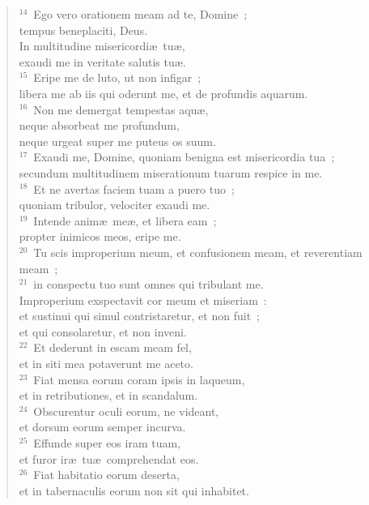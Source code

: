 \begin{flushleft}
\begin{verse}
${}^{14}$~Ego vero orationem meam ad te, Domine~;\\ tempus beneplaciti, Deus.\\ In multitudine misericordi\ae\ tu\ae ,\\ exaudi me in veritate salutis tu\ae .\\
${}^{15}$~Eripe me de luto, ut non infigar~;\\ libera me ab iis qui oderunt me, et de profundis aquarum.\\
${}^{16}$~Non me demergat tempestas aqu\ae ,\\ neque absorbeat me profundum,\\ neque urgeat super me puteus os suum.\\
${}^{17}$~Exaudi me, Domine, quoniam benigna est misericordia tua~;\\ secundum multitudinem miserationum tuarum respice in me.\\
${}^{18}$~Et ne avertas faciem tuam a puero tuo~;\\ quoniam tribulor, velociter exaudi me.\\
${}^{19}$~Intende anim\ae\ me\ae , et libera eam~;\\ propter inimicos meos, eripe me.\\
${}^{20}$~Tu scis improperium meum, et confusionem meam, et reverentiam meam~;\\
${}^{21}$~in conspectu tuo sunt omnes qui tribulant me.\\ Improperium exspectavit cor meum et miseriam~:\\ et sustinui qui simul contristaretur, et non fuit~;\\ et qui consolaretur, et non inveni.\\
${}^{22}$~Et dederunt in escam meam fel,\\ et in siti mea potaverunt me aceto.\\
${}^{23}$~Fiat mensa eorum coram ipsis in laqueum,\\ et in retributiones, et in scandalum.\\
${}^{24}$~Obscurentur oculi eorum, ne videant,\\ et dorsum eorum semper incurva.\\
${}^{25}$~Effunde super eos iram tuam,\\ et furor ir\ae\ tu\ae\ comprehendat eos.\\
${}^{26}$~Fiat habitatio eorum deserta,\\ et in tabernaculis eorum non sit qui inhabitet.\\

\end{verse}
\end{flushleft}
